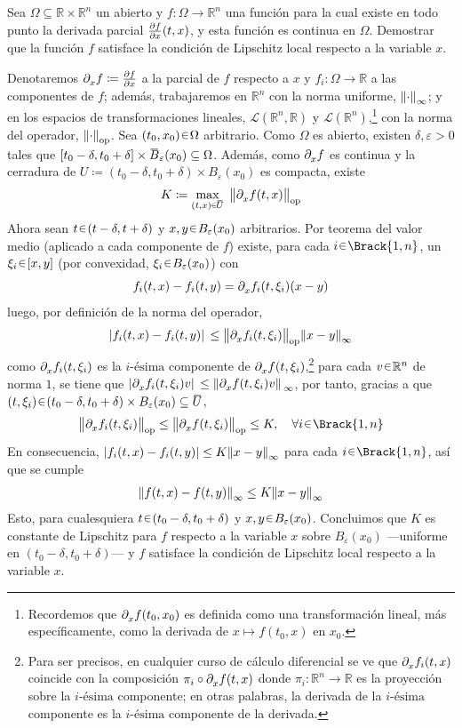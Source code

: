 \begin{ejer}
Sea $\Omega \subseteq \mathbb{R} \times \mathbb{R}^n$ un abierto y 
$f \colon \Omega \to \mathbb{R}^n$ una función para la cual existe en todo punto 
la derivada parcial $\diffp fx (t, x)$, y esta función es 
continua en $\Omega$. Demostrar que la función $f$ satisface la condición 
de Lipschitz local respecto a la variable $x$.
\end{ejer}
\begin{sol}
Denotaremos $\difcp fx \coloneq \diffp fx$ a la parcial de $f$ respecto a $x$ y $f_i \colon \Omega \to \mathbb{R}$ a las componentes de $f$; además, trabajaremos en $\mathbb{R}^n$ con la norma uniforme, $\norm{\cdot}_{\infty}$; y en los espacios de transformaciones lineales, $\mathcal{L}(\mathbb{R}^n,\mathbb{R})$ y $\mathcal{L}(\mathbb{R}^n)$,\footnote{Recordemos que $\difcp fx(t_0,x_0)$ es definida como una transformación lineal, más específicamente, como la derivada de $x \mapsto f(t_0,x)$ en $x_0$.} con la norma del operador, $\norm{\cdot}_\text{op}$. Sea $(t_0,x_0) \en \Omega$ arbitrario. Como $\Omega$ es abierto, existen $\delta,\varepsilon>0$ tales que $[t_0-\delta, t_0+\delta] \times \ubar{B}_\varepsilon(x_0) \subseteq \Omega$. Además, como $\difcp fx$ es continua y la cerradura de $U \coloneq (t_0-\delta, t_0+\delta) \times B_\varepsilon(x_0)$ es compacta, existe 
\[
K \coloneq%
\max_{(t,x) \en \ubar{U}}\;%
\norm{\difcp fx (t,x)}_\text{op}
\]
Ahora sean $t \en (t-\delta,t+\delta)$ y $x,y \en B_\varepsilon(x_0)$ arbitrarios. Por teorema del valor medio (aplicado a cada componente de $f$) existe, para cada $i \en \Brack{1,n}$, un $\xi_i \en [x,y]$ (por convexidad, $\xi_i \en B_\varepsilon(x_0)$) con
\[
f_i(t,x) - f_i(t,y) = \difcp{f_i}x(t,\xi_i) (x - y)
\]
luego, por definición de la norma del operador,
\[
\abs*{f_i(t,x) - f_i(t,y)} \leq \norm{\difcp{f_i}x(t,\xi_i)}_\text{op} \norm{x - y}_{\infty}
\]
como $\difcp{f_i}x(t,\xi_i)$ es la $i\text{-ésima}$ componente de $\difcp{f}x(t,\xi_i)$,\footnote{Para ser precisos, en cualquier curso de cálculo diferencial se ve que $\difcp {f_i}x(t,x)$ coincide con la composición $\pi_i \circ \difcp fx(t,x)$ donde $\pi_i \colon \mathbb{R}^n \to \mathbb{R}$ es la proyección sobre la $i\text{-ésima}$ componente; en otras palabras, la derivada de la $i\text{-ésima}$ componente es la $i\text{-ésima}$ componente de la derivada.} para cada $v \en \mathbb{R}^n$ de norma $1$, se tiene que $\abs*{\difcp{f_i}x(t,\xi_i)v} \leq \norm*{\difcp{f}x(t,\xi_i)v}_\infty$, por tanto, gracias a que $(t,\xi_i) \en (t_0-\delta, t_0+\delta) \times B_\varepsilon(x_0) \subseteq \ubar{U}$,
\[
\norm{\difcp{f_i}x(t,\xi_i)}_\text{op}%
\leq \norm{\difcp{f}x(t,\xi_i)}_\text{op}%
\leq K,%
\quad\forall i \en \Brack{1,n}
\]
En consecuencia, $\abs{f_i(t,x) - f_i(t,y)} \leq K \norm{x - y}_{\infty}$ para cada $i \en \Brack{1,n}$, así que se cumple
\[
\norm{f(t,x) - f(t,y)}_{\infty} \leq K \norm{x - y}_{\infty}
\]
Esto, para cualesquiera $t \en (t_0-\delta,t_0+\delta)$ y $x,y \en B_\varepsilon(x_0)$. Concluimos que $K$ es constante de Lipschitz para $f$ respecto a la variable $x$ sobre $B_\varepsilon(x_0)$ ---uniforme en $(t_0-\delta,t_0+\delta)$--- y $f$ satisface la condición de Lipschitz local respecto a la variable $x$.
\end{sol}

